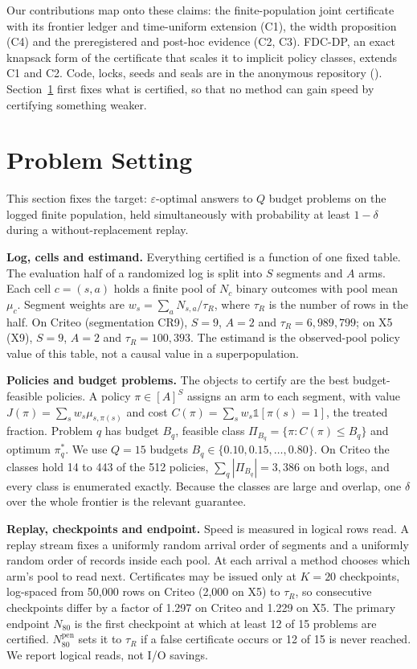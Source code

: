 \documentclass[sigconf,anonymous,review]{acmart}
\newcommand{\eps}{\varepsilon}
\newcommand{\Npen}{N_{80}^{\text{pen}}}
\begin{document}
\noindent Our contributions map onto these claims: the finite-population joint certificate with its frontier ledger and time-uniform extension (C1), the width proposition (C4) and the preregistered and post-hoc evidence (C2, C3). FDC-DP, an exact knapsack form of the certificate that scales it to implicit policy classes, extends C1 and C2. Code, locks, seeds and seals are in the anonymous repository (\anonrepo). Section~\ref{sec:setting} first fixes what is certified, so that no method can gain speed by certifying something weaker.

\section{Problem Setting}\label{sec:setting}

This section fixes the target: $\eps$-optimal answers to $Q$ budget problems on the logged finite population, held simultaneously with probability at least $1-\delta$ during a without-replacement replay.

\textbf{Log, cells and estimand.} Everything certified is a function of one fixed table. The evaluation half of a randomized log is split into $S$ segments and $A$ arms. Each cell $c = (s,a)$ holds a finite pool of $N_c$ binary outcomes with pool mean $\mu_c$. Segment weights are $w_s = \sum_a N_{s,a}/\tau_R$, where $\tau_R$ is the number of rows in the half. On Criteo (segmentation CR9), $S = 9$, $A = 2$ and $\tau_R = 6{,}989{,}799$; on X5 (X9), $S = 9$, $A = 2$ and $\tau_R = 100{,}393$. The estimand is the observed-pool policy value of this table, not a causal value in a superpopulation.

\textbf{Policies and budget problems.} The objects to certify are the best budget-feasible policies. A policy $\pi \in [A]^S$ assigns an arm to each segment, with value $J(\pi) = \sum_s w_s \mu_{s,\pi(s)}$ and cost $C(\pi) = \sum_s w_s \mathbb{1}[\pi(s) = 1]$, the treated fraction. Problem $q$ has budget $B_q$, feasible class $\Pi_{B_q} = \{\pi : C(\pi) \le B_q\}$ and optimum $\pi^*_q$. We use $Q = 15$ budgets $B_q \in \{0.10, 0.15, \dots, 0.80\}$. On Criteo the classes hold 14 to 443 of the 512 policies, $\sum_q |\Pi_{B_q}| = 3{,}386$ on both logs, and every class is enumerated exactly. Because the classes are large and overlap, one $\delta$ over the whole frontier is the relevant guarantee.

\textbf{Replay, checkpoints and endpoint.} Speed is measured in logical rows read. A replay stream fixes a uniformly random arrival order of segments and a uniformly random order of records inside each pool. At each arrival a method chooses which arm's pool to read next. Certificates may be issued only at $K = 20$ checkpoints, log-spaced from 50,000 rows on Criteo (2,000 on X5) to $\tau_R$, so consecutive checkpoints differ by a factor of 1.297 on Criteo and 1.229 on X5. The primary endpoint $N_{80}$ is the first checkpoint at which at least 12 of 15 problems are certified. $\Npen$ sets it to $\tau_R$ if a false certificate occurs or 12 of 15 is never reached. We report logical reads, not I/O savings.
\end{document}
